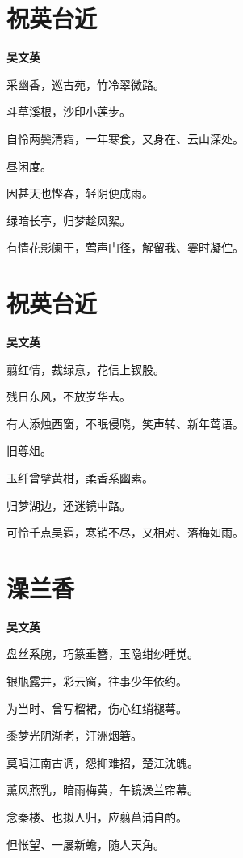 \documentclass[12pt,a4paper]{ctexbook}
\begin{document}
\section{祝英台近}
\textbf{吴文英}\par\vspace{0.5em}
采幽香，巡古苑，竹冷翠微路。\par
斗草溪根，沙印小莲步。\par
自怜两鬓清霜，一年寒食，又身在、云山深处。\par
昼闲度。\par
因甚天也悭春，轻阴便成雨。\par
绿暗长亭，归梦趁风絮。\par
有情花影阑干，莺声门径，解留我、霎时凝伫。\par

\section{祝英台近}
\textbf{吴文英}\par\vspace{0.5em}
翦红情，裁绿意，花信上钗股。\par
残日东风，不放岁华去。\par
有人添烛西窗，不眠侵晓，笑声转、新年莺语。\par
旧尊俎。\par
玉纤曾擘黄柑，柔香系幽素。\par
归梦湖边，还迷镜中路。\par
可怜千点吴霜，寒销不尽，又相对、落梅如雨。\par

\section{澡兰香}
\textbf{吴文英}\par\vspace{0.5em}
盘丝系腕，巧篆垂簪，玉隐绀纱睡觉。\par
银瓶露井，彩云窗，往事少年依约。\par
为当时、曾写榴裙，伤心红绡褪萼。\par
黍梦光阴渐老，汀洲烟箬。\par
莫唱江南古调，怨抑难招，楚江沈魄。\par
薰风燕乳，暗雨梅黄，午镜澡兰帘幕。\par
念秦楼、也拟人归，应翦菖浦自酌。\par
但怅望、一屡新蟾，随人天角。\par
\end{document}
